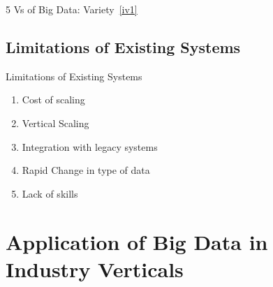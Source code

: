 \documentclass[pdf]{beamer}
\begin{document}
\begin{frame}[fragile, label={vari}]{5 Vs of Big Data: Variety~\ref{iv1}}
\end{frame}

\subsection{Limitations of Existing Systems}
\begin{frame}[fragile]{Limitations of Existing Systems}
\begin{enumerate}
	\item Cost of scaling \pause
	\item Vertical Scaling \pause
	\item Integration with legacy systems \pause
	\item Rapid Change in type of data \pause
	\item Lack of skills
\end{enumerate}
\end{frame}

\section{Application of Big Data in Industry Verticals}
\end{document}
